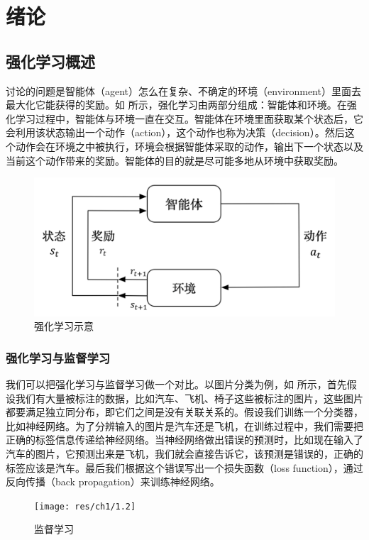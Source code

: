 \section{绪论}
\setcounter{page}{1}
\subsection{强化学习概述}

讨论的问题是智能体（agent）怎么在复杂、不确定的环境（environment）里面去最大化它能获得的奖励。如 所示，强化学习由两部分组成：智能体和环境。在强化学习过程中，智能体与环境一直在交互。智能体在环境里面获取某个状态后，它会利用该状态输出一个动作（action），这个动作也称为决策（decision）。然后这个动作会在环境之中被执行，环境会根据智能体采取的动作，输出下一个状态以及当前这个动作带来的奖励。智能体的目的就是尽可能多地从环境中获取奖励。
\begin{figure}[htb]
    \centering
    \includegraphics[width=0.7\linewidth]{res/ch1/1.1.png}
    \caption{强化学习示意}
    \label{fig:rl}
\end{figure}

\subsubsection{强化学习与监督学习}
我们可以把强化学习与监督学习做一个对比。以图片分类为例，如 所示，首先假设我们有大量被标注的数据，比如汽车、飞机、椅子这些被标注的图片，这些图片都要满足独立同分布，即它们之间是没有关联关系的。假设我们训练一个分类器，比如神经网络。为了分辨输入的图片是汽车还是飞机，在训练过程中，我们需要把正确的标签信息传递给神经网络。当神经网络做出错误的预测时，比如现在输入了汽车的图片，它预测出来是飞机，我们就会直接告诉它，该预测是错误的，正确的标签应该是汽车。最后我们根据这个错误写出一个损失函数（loss function），通过反向传播（back propagation）来训练神经网络。

\begin{figure}[htb]
    \centering
    \texttt{[image: res/ch1/1.2]}
    \caption{监督学习}
    \label{fig:sl}
\end{figure}


